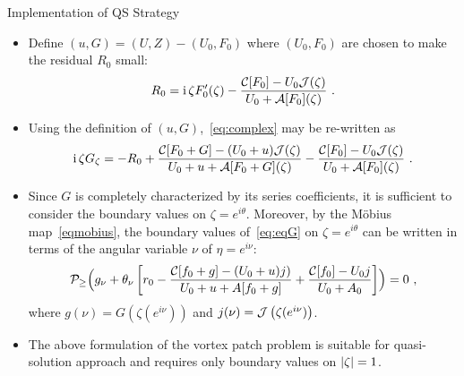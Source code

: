 \begin{block}{Implementation of QS Strategy}

  \begin{itemize}
  \item Define $(u, G) = (U, Z) - (U_0, F_0)$
    where $(U_0, F_0)$ are chosen to make the residual $R_0$ small:
    \begin{equation}
      \label{eq:eqR0}
      R_0 =
      \operatorname{i} \zeta F_0^\prime (\zeta) - \frac{\mathcal{C}[F_0] - U_0 \mathcal{J} (\zeta) }{ U_0+\mathcal{A}[F_0] (\zeta) }
      \ .
    \end{equation}
  \item Using the definition of $(u, G)$,~\eqref{eq:complex} may be
    re-written as
    \begin{equation}
      \label{eq:eqG}
      \operatorname{i} \zeta G_\zeta = -R_0 +
      \frac{\mathcal{C}[F_0+G] - (U_0 +u) \mathcal{J} (\zeta) }{ U_0+u+\mathcal{A}[F_0 +G] (\zeta) }
      - \frac{\mathcal{C}[F_0] - U_0 \mathcal{J} (\zeta) }{ U_0+\mathcal{A}[F_0] (\zeta) }
      \ .
    \end{equation}
  \item Since $G$ is completely characterized by its series
    coefficients, it is sufficient to consider the boundary values on
    $\zeta = e^{i\theta}$. Moreover, by the M\"{o}bius map~\eqref{eqmobius},
    the boundary values of~\eqref{eq:eqG} on $\zeta = e^{i\theta}$ can be
    written in terms of the angular variable $\nu$ of $\eta = e^{i\nu}$:
    \begin{equation}
      \label{eq:geq}
      \mathcal{P}_\ge \Bigl (
      g_\nu + \theta_\nu \left [ r_0 - \frac{\mathcal{C}[f_0+g] - (U_0+u) j)}{U_0+u+ {A}
          [f_0+g]} + \frac{\mathcal{C}[f_0] - U_0 j }{U_0+ A_0} \right ]
      \Bigr ) = 0 \ ,
    \end{equation}
    where $g (\nu) = G \left ( \zeta (e^{i\nu}) \right )$ and $j(\nu) = \mathcal{J}
    \left(  \zeta(e^{i\nu}) \right)$.
  \item The above formulation of the vortex patch problem
    is suitable for quasi-solution approach and requires only
    boundary values on $\left|\zeta\right| = 1$.
  \end{itemize}

\end{block}

